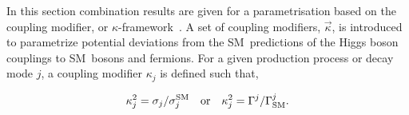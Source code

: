 \newcommand{\MeV}{\ensuremath{\,\text{Me\hspace{-.08em}V}}\xspace}
\renewcommand{\gg}{\ensuremath{\PGg\PGg}\xspace}
\newcommand{\hgg}{\ensuremath{\PH\to\gg}\xspace}
\newcommand{\ggh}{\ensuremath{\Pg\Pg\PH}\xspace}
\newcommand{\vbf}{\ensuremath{\mathrm{VBF}}\xspace}
\newcommand{\vh}{\ensuremath{\mathrm{V}\PH}\xspace}
\newcommand{\tth}{\ensuremath{\Pqt\Pqt\PH}\xspace}
\newcommand{\zz}{\ensuremath{\PZ\PZ}\xspace}
\newcommand{\hzz}{\ensuremath{\PH\to\zz}\xspace}
\newcommand{\hzzllll}{\ensuremath{\hzz^{(\ast)}\to 4\ell}\xspace}
\newcommand{\ww}{\ensuremath{\PW\PW}\xspace}
\newcommand{\hww}{\ensuremath{\PH\to\ww}\xspace}
\newcommand{\hwwlnln}{\ensuremath{\hww^{(\ast)}\to\ell\Pgn\ell\Pgn}\xspace}
\newcommand{\bb}{\ensuremath{\PQb\PQb}\xspace}
\newcommand{\hbb}{\ensuremath{\PH\to\bb}\xspace}
\newcommand{\tautau}{\ensuremath{\Pgt\Pgt}\xspace}
\newcommand{\htt}{\ensuremath{\PH\to\tautau}\xspace}
\newcommand{\hlep}{\ensuremath{\PH\to\text{leptons}}\xspace}
\newcommand{\mumu}{\ensuremath{\PGm\PGm}\xspace}
\newcommand{\hmm}{\ensuremath{\PH\to\mumu}\xspace}
\newcommand{\wh}{\ensuremath{\PW\PH}\xspace}
\newcommand{\zh}{\ensuremath{\PZ\PH}\xspace}
\providecommand{\fbinv}{\mbox{\ensuremath{\,\text{fb}^\text{$-$1}}}\xspace}
\newcommand{\SM}{\ensuremath{\mathrm{SM}}\xspace}
\newcommand{\kZ}{\ensuremath{\kappa_{\mathrm{\PZ}}}\xspace}
\newcommand{\kW}{\ensuremath{\kappa_{\mathrm{\PW}}}\xspace}
\newcommand{\ktau}{\ensuremath{\kappa_{\PGt}}\xspace}
\newcommand{\ktop}{\ensuremath{\kappa_{\Pqt}}\xspace}
\newcommand{\kb}{\ensuremath{\kappa_{\Pqb}}\xspace}
\newcommand{\kmu}{\ensuremath{\kappa_{\Pgm}}\xspace}
\newcommand{\kglu}{\ensuremath{\kappa_{\mathrm{\Pg}}}\xspace}
\newcommand{\kgam}{\ensuremath{\kappa_{\PGg}}\xspace}
\newcommand{\GammaSM}{\ensuremath{\Gamma_{\PH}/\Gamma_{\PH}^{\mathrm{SM}}}\xspace}
\newcommand{\Bbsm}{\ensuremath{\mathrm{B_{BSM}}}\xspace}
\newcommand{\kV}{\ensuremath{\kappa_{\mathrm{V}}}\xspace}

In this section combination results are given for a parametrisation based on the coupling modifier, or $\kappa$-framework~\cite{Heinemeyer:2013tqa}. A set of coupling modifiers, $\vec\kappa$, is introduced to parametrize potential deviations from the SM~predictions of the Higgs boson couplings to SM~bosons and fermions. For a given production process or decay mode $j$, a coupling modifier $\kappa_j$ is defined such that,

\begin{equation}
\label{eq:kappa}
  \kappa_j^2=\sigma_j/\sigma_j^\SM\ \ \ {\rm or}\ \ \  \kappa_j^2=\Gamma^j/\Gamma^j_\SM.
\end{equation}

